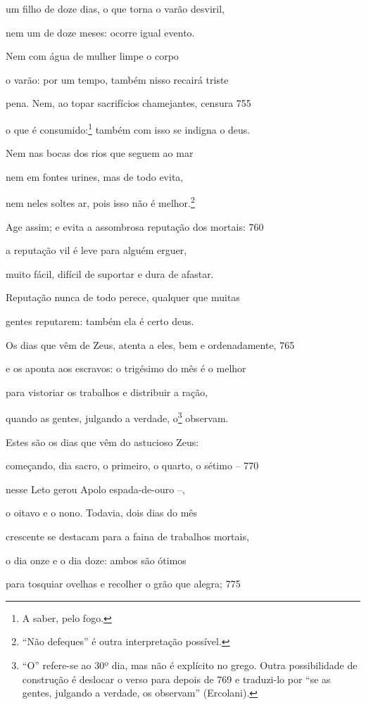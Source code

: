 um filho de doze dias, o que torna o varão desviril,

nem um de doze meses: ocorre igual evento.

Nem com água de mulher limpe o corpo

o varão: por um tempo, também nisso recairá triste

pena. Nem, ao topar sacrifícios chamejantes, censura \num{755}

o que é consumido:\footnote{A saber, pelo fogo.} também com isso se indigna o deus.

Nem nas bocas dos rios que seguem ao mar

nem em fontes urines, mas de todo evita,

nem neles soltes ar, pois isso não é melhor.\footnote{``Não defeques'' é outra interpretação possível.}

Age assim; e evita a assombrosa reputação dos mortais: \num{760}

a reputação vil é leve para alguém erguer,

muito fácil, difícil de suportar e dura de afastar.

Reputação nunca de todo perece, qualquer que muitas

gentes reputarem: também ela é certo deus.

Os dias que vêm de Zeus, atenta a eles, bem e ordenadamente, \num{765}

e os aponta aos escravos: o trigésimo do mês é o melhor

para vistoriar os trabalhos e distribuir a ração,

quando as gentes, julgando a verdade, o\footnote{``O'' refere-se ao 30º dia, mas não é explícito no grego. Outra
possibilidade de construção é deslocar o verso para depois de 769 e
traduzi-lo por ``se as gentes, julgando a verdade, os observam''
(Ercolani).} observam.

Estes são os dias que vêm do astucioso Zeus:

começando, dia sacro, o primeiro, o quarto, o sétimo -- \num{770}

nesse Leto gerou Apolo espada-de-ouro --,

o oitavo e o nono. Todavia, dois dias do mês

crescente se destacam para a faina de trabalhos mortais,

o dia onze e o dia doze: ambos são ótimos

para tosquiar ovelhas e recolher o grão que alegra; \num{775}


